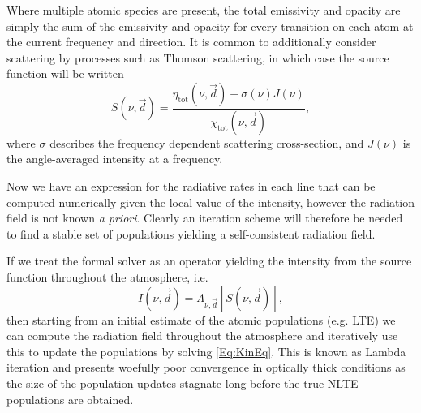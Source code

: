 Where multiple atomic species are present, the total emissivity and opacity are simply the sum of the emissivity and opacity for every transition on each atom at the current frequency and direction. It is common to additionally consider scattering by processes such as Thomson scattering, in which case the source function will be written
\begin{equation}
    S(\nu, \vec{d}) = \frac{\eta_\mathrm{tot}(\nu, \vec{d}) + \sigma(\nu)J(\nu)}{\chi_\mathrm{tot}(\nu, \vec{d})},
\end{equation}
where $\sigma$ describes the frequency dependent scattering cross-section, and $J(\nu)$ is the angle-averaged intensity at a frequency.

Now we have an expression for the radiative rates in each line that can be computed numerically given the local value of the intensity, however the radiation field is not known \textit{a priori}. Clearly an iteration scheme will therefore be needed to find a stable set of populations yielding a self-consistent radiation field.

If we treat the formal solver as an operator yielding the intensity from the source function throughout the atmosphere, i.e.
\begin{equation}
    I(\nu, \vec{d}) = \Lambda_{\nu,\vec{d}}[S(\nu, \vec{d})],
    \label{Eq:LambdaOperator}
\end{equation}
then starting from an initial estimate of the atomic populations (e.g. LTE) we can compute the radiation field throughout the atmosphere and iteratively use this to update the populations by solving \eqref{Eq:KinEq}. This is known as Lambda iteration and presents woefully poor convergence in optically thick conditions as the size of the population updates stagnate long before the true NLTE populations are obtained.

